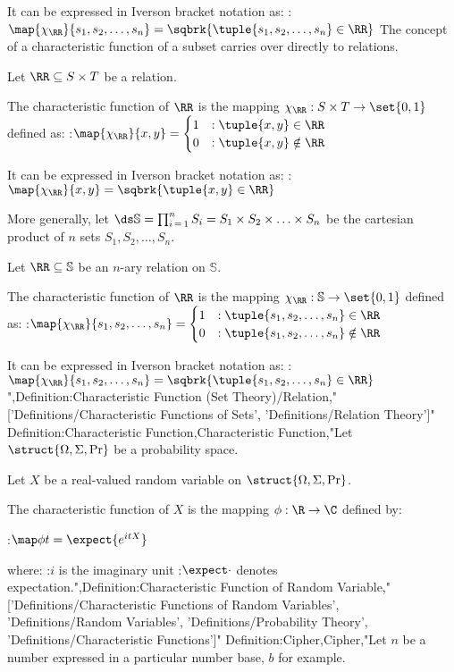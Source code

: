 It can be expressed in Iverson bracket notation as:
:$\map {\chi_\RR} {s_1, s_2, \ldots, s_n} = \sqbrk {\tuple {s_1, s_2, \ldots, s_n} \in \RR}$
The concept of a characteristic function of a subset carries over directly to relations.


Let $\RR \subseteq S \times T$ be a relation.

The characteristic function of $\RR$ is the mapping $\chi_\RR: S \times T \to \set {0, 1}$ defined as:
:$\map {\chi_\RR} {x, y} = \begin {cases} 1 & : \tuple {x, y} \in \RR \\ 0 & : \tuple {x, y} \notin \RR \end{cases}$


It can be expressed in Iverson bracket notation as:
:$\map {\chi_\RR} {x, y} = \sqbrk {\tuple {x, y} \in \RR}$


More generally, let $\ds \mathbb S = \prod_{i \mathop = 1}^n S_i = S_1 \times S_2 \times \ldots \times S_n$ be the cartesian product of $n$ sets $S_1, S_2, \ldots, S_n$.

Let $\RR \subseteq \mathbb S$ be an $n$-ary relation on $\mathbb S$.

The characteristic function of $\RR$ is the mapping $\chi_\RR: \mathbb S \to \set {0, 1}$ defined as:
:$\map {\chi_\RR} {s_1, s_2, \ldots, s_n} = \begin {cases} 1 & : \tuple {s_1, s_2, \ldots, s_n} \in \RR \\ 0 & : \tuple {s_1, s_2, \ldots, s_n} \notin \RR \end {cases}$


It can be expressed in Iverson bracket notation as:
:$\map {\chi_\RR} {s_1, s_2, \ldots, s_n} = \sqbrk {\tuple {s_1, s_2, \ldots, s_n} \in \RR}$
",Definition:Characteristic Function (Set Theory)/Relation,"['Definitions/Characteristic Functions of Sets', 'Definitions/Relation Theory']"
Definition:Characteristic Function,Characteristic Function,"Let $\struct {\Omega, \Sigma, \Pr}$ be a probability space.

Let $X$ be a real-valued random variable on $\struct {\Omega, \Sigma, \Pr}$.


The characteristic function of $X$ is the mapping $\phi: \R \to \C$ defined by:

:$\map \phi t = \expect {e^{i t X} }$

where:
:$i$ is the imaginary unit
:$\expect \cdot$ denotes expectation.",Definition:Characteristic Function of Random Variable,"['Definitions/Characteristic Functions of Random Variables', 'Definitions/Random Variables', 'Definitions/Probability Theory', 'Definitions/Characteristic Functions']"
Definition:Cipher,Cipher,"Let $n$ be a number expressed in a particular number base, $b$ for example.


